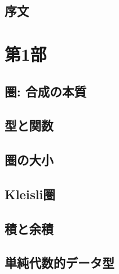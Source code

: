 


\frontmatter
\tableofcontents


\chapter*{序文}
\label{Preface}


\mainmatter

\part*{第1部}

\chapter{圏: 合成の本質}\label{category-the-essence-of-composition}


\chapter{型と関数}\label{types-and-functions}


\chapter{圏の大小}\label{categories-great-and-small}


\chapter{Kleisli圏}\label{kleisli-categories}


\chapter{積と余積}\label{products-and-coproducts}


\chapter{単純代数的データ型}\label{simple-algebraic-data-types}


